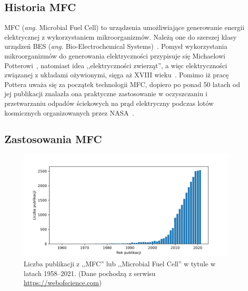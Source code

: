 \subsection{Historia MFC}\label{subsec:historia}
MFC (\textit{ang.} Microbial Fuel Cell) to urządzenia umożliwiające
generowanie energii elektrycznej z wykorzystaniem mikroorganizmów.
Należą one do szerszej klasy urządzeń BES (\textit{ang.}
Bio-Electrochemical Systems)~\cite{Santoro2017}.
Pomysł wykorzystania mikroorganizmów do generowania elektryczności
przypisuje się Michaelowi Potterowi~\cite{Potter1911},
natomiast idea ,,elektryczności zwierząt'', a więc elektryczności
związanej z układami ożywionymi, sięga aż XVIII wieku~\cite{Santoro2017}.
Pomimo iż pracę Pottera uważa się za początek technologii MFC,
dopiero po ponad 50 latach od jej publikacji
znalazła ona praktyczne zastosowanie w oczyszczaniu i przetwarzaniu
odpadów ściekowych na prąd elektryczny podczas lotów kosmicznych
organizowanych przez NASA~\cite{Slate2019}.

\subsection{Zastosowania MFC}\label{subsec:zastosowania-mfc}

\begin{figure}[!b]
    \centering
    \includegraphics[width=12cm]{figures/publications}
    \caption{
        Liczba publikacji z ,,MFC'' lub
        ,,Microbial Fuel Cell'' w tytule w latach 1958--2021.
        (Dane pochodzą z serwisu \url{https://webofscience.com})
    }
    \label{fig:1}
\end{figure}

